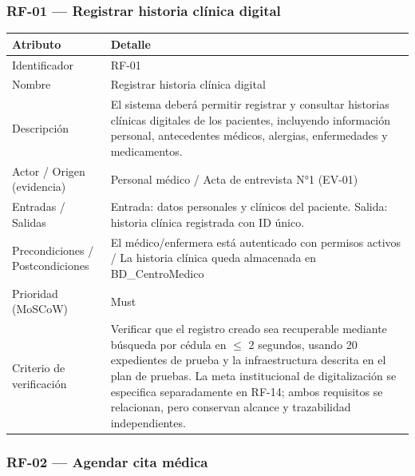 \documentclass[11pt,a4paper]{article}
\begin{document}
	\subsubsection{RF-01 --- Registrar historia clínica digital}
	
	
	\begin{longtable}{p{} p{}}
		
		\toprule
		\textbf{Atributo} & \textbf{Detalle} \\
		\midrule
		\endhead
		
		Identificador & RF-01 \\		
		Nombre & Registrar historia clínica digital \\		
		Descripción &
		El sistema deberá permitir registrar y consultar historias clínicas digitales de los pacientes, incluyendo información personal, antecedentes médicos, alergias, enfermedades y medicamentos. \\
		Actor / Origen (evidencia) &
		Personal médico / Acta de entrevista N°1 (EV-01) \\		
		Entradas / Salidas &
		Entrada: datos personales y clínicos del paciente. Salida: historia clínica registrada con ID único. \\
		Precondiciones / Postcondiciones &
		El médico/enfermera está autenticado con permisos activos / La historia clínica queda almacenada en BD\_CentroMedico \\
		
		Prioridad (MoSCoW) &		Must \\
		Criterio de verificación &
		Verificar que el registro creado sea recuperable mediante búsqueda por cédula en \(\leq\) 2 segundos, usando 20 expedientes de prueba y la infraestructura descrita en el plan de pruebas. La meta institucional de digitalización se especifica separadamente en RF-14; ambos requisitos se relacionan, pero conservan alcance y trazabilidad independientes. \\
		
		\bottomrule
		
	\end{longtable}
	
	\subsubsection{RF-02 --- Agendar cita médica}
	
\end{document}
